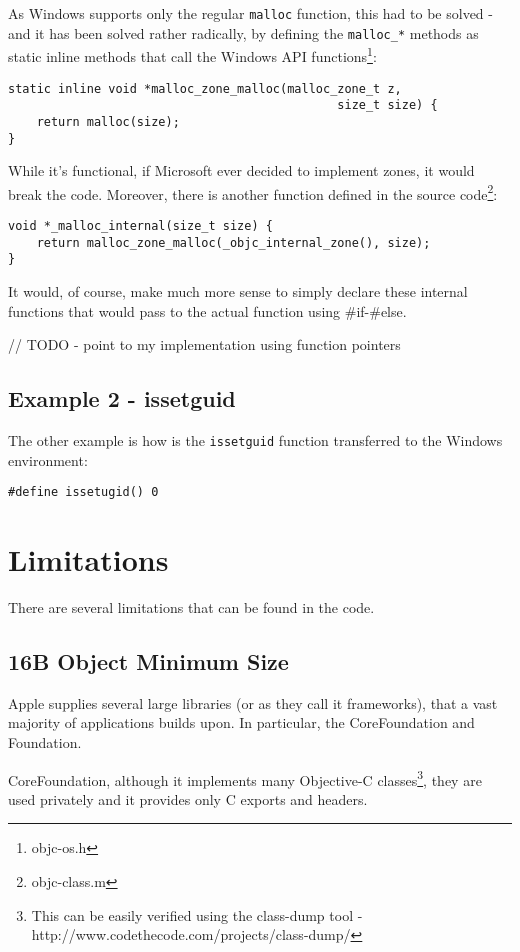 As Windows supports only the regular \verb=malloc= function, this had to be solved - and it has been solved rather radically, by defining the \verb=malloc_*= methods as static inline methods that call the Windows API functions\footnote{objc-os.h}:

\begin{verbatim}
static inline void *malloc_zone_malloc(malloc_zone_t z, 
                                              size_t size) { 
    return malloc(size); 
}
\end{verbatim}

While it's functional, if Microsoft ever decided to implement zones, it would break the code. Moreover, there is another function defined in the source code\footnote{objc-class.m}:

\begin{verbatim}
void *_malloc_internal(size_t size) {
    return malloc_zone_malloc(_objc_internal_zone(), size);
}
\end{verbatim}

It would, of course, make much more sense to simply declare these internal functions that would pass to the actual function using #if-#else.

// TODO - point to my implementation using function pointers

\subsection{Example 2 - issetguid}
The other example is how is the \verb=issetguid= function transferred to the Windows environment:

\begin{verbatim}
#define issetugid() 0
\end{verbatim}

\section{Limitations}
There are several limitations that can be found in the code.

\subsection{16B Object Minimum Size}
Apple supplies several large libraries (or as they call it frameworks), that a vast majority of applications builds upon. In particular, the CoreFoundation and Foundation.

CoreFoundation, although it implements many Objective-C classes\footnote{This can be easily verified using the class-dump tool - http://www.codethecode.com/projects/class-dump/}, they are used privately and it provides only C exports and headers.

